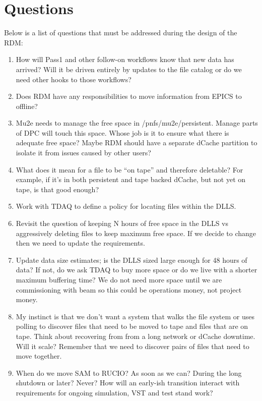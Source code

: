 \chapter{Questions}
\label{ch:questions}

Below is a list of questions that must be addressed during the design of the RDM:

\begin{enumerate}
\item How will Pass1 and other follow-on workflows know that new data has arrived?
  Will it be driven entirely by updates to the file catalog or do we need other
  hooks to those workflows?
\item Does RDM have any responsibilities to move information from EPICS to offline?
\item Mu2e needs to manage the free space in /pnfs/mu2e/persistent. Manage parts of DPC will touch this space.
  Whose job is it to ensure what there is adequate free space? Maybe RDM should have a separate dCache
  partition to isolate it from issues caused by other users?
\item What does it mean for a file to be ``on tape'' and therefore deletable?
  For example, if it's in both persistent and tape backed dCache, but not yet on tape, is that good enough?
\item Work with TDAQ to define a policy for locating files within the DLLS.
\item Revisit the question of keeping N hours of free space in the DLLS vs aggressively deleting files to keep
  maximum free space.  If we decide to change then we need to update the requirements.
\item Update data size estimates;  is the DLLS sized large enough for 48 hours of data?
  If not, do we ask TDAQ to buy more space or do we live with a shorter maximum buffering time?
  We do not need more space until we are commissioning with beam so this could be operations money, not project money.
\item My instinct is that we don't want a system that walks the file system or uses polling to discover files that need to be moved to tape
  and files that are on tape.
  Think about recovering from from a long network or dCache downtime.  Will it scale?
  Remember that we need to discover pairs of files that need to move together.
\item   When do we move SAM to RUCIO? As soon as we can? During the long shutdown or later?  Never?
  How will an early-ish transition interact with requirements for ongoing simulation, VST and test stand work?

\end{enumerate}

